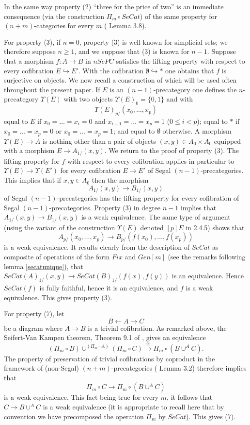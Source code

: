 In the same way property (2) ``three for the price of two''
is an immediate consequence (via the construction $\Pi _m\circ SeCat$)
of the same property for $(n+m)$-categories for every $m$
(\cite{nCAT} Lemma 3.8).

For property (3),
if $n=0$, property (3) is well known for
simplicial sets; we therefore suppose $n\geq 1$, and we suppose that (3)
is known for $n-1$.  Suppose that a morphism $f:A\rightarrow B$
in $nSePC$ satisfies the lifting property with respect to every
cofibration $E\hookrightarrow E'$. With the cofibration $\emptyset
\hookrightarrow \ast$ one
obtains that $f$ is surjective on objects. We now recall a
construction of \cite{limits} which will be used often throughout the
present paper. If $E$ is an $(n-1)$-precategory one defines the $n$-precategory
$\Upsilon (E)$ with two objects $\Upsilon (E)_0 = \{ 0,1\}$ and with
$$
\Upsilon (E)_{p/}(x_0,\ldots , x_p)
$$
equal to $E$
if $x_0=\ldots = x_i=0$ and $x_{i+1}=\ldots = x_p = 1$ ($0\leq i<p$); equal
to $\ast$
if $x_0=\ldots = x_p=0$ or $x_0=\ldots = x_p=1$; and equal
to $\emptyset$
otherwise. A morphism $\Upsilon (E)\rightarrow A$
 is nothing other than
a pair of objects $(x,y)\in A_0\times A_0$ equipped with a morphism
$E\rightarrow
A_{1/}(x,y)$. We return to the proof of property (3). The
lifting property for $f$ with respect to every cofibration
applies in particular
to $\Upsilon (E)\rightarrow \Upsilon (E')$ for
every cofibration $E\rightarrow E'$ of Segal $(n-1)$-precategories. This
implies
that if $x,y\in A_0$ then the morphism
$$
A_{1/}(x,y)\rightarrow B_{1/}(x,y)
$$
of Segal $(n-1)$-precategories has the lifting property for every
cofibration of Segal $(n-1)$-precategories. Property (3) in degree $n-1$
implies that $A_{1/} (x,y)\rightarrow B_{1/}(x,y)$ is a weak
equivalence. The same type of argument (using the variant of
the construction $\Upsilon (E)$ denoted $[p]E$
in \cite{limits} 2.4.5) shows that
$$
A_{p/}(x_0,\ldots , x_p)\rightarrow B_{p/}(f(x_0),\ldots , f(x_p))
$$
is a
weak equivalence. It results clearly from the description of $SeCat$ as
composite of operations of the form $Fix$ and $Gen[m]$ (see the remarks
following lemma \ref{secatunique}), that $SeCat(A)_{1/}(x,y)\rightarrow
SeCat(B)_{1/}(f(x), f(y))$ is an equivalence. Hence $SeCat(f)$ is fully
faithful, hence it is an equivalence, and $f$ is a weak equivalence.
This gives property (3).

For property (7), let
$$
B\leftarrow     A\rightarrow C
$$
be a diagram where $A\rightarrow B$ is a trivial cofibration. As remarked
above,  the Seifert-Van Kampen theorem, Theorem 9.1 of
\cite{nCAT}, gives an equivalence
$$
(\Pi _m\circ B) \cup ^{(\Pi _m \circ A)}(\Pi _m \circ C)
\stackrel{\cong}{\rightarrow} \Pi _m\circ (B\cup ^AC).
$$
The property of preservation of trivial cofibrations by coproduct
in the framework
of (non-Segal) $(n+m)$-precategories (\cite{nCAT} Lemma 3.2) therefore implies
that
$$
\Pi _m \circ C\rightarrow
\Pi _m \circ (B\cup ^AC)
$$
is a weak equivalence. This fact being true for every $m$, it follows
that $C\rightarrow
B\cup ^AC$ is a weak equivalence (it is appropriate to recall here that by
convention we have precomposed the operation $\Pi_m$ by $SeCat$). This
gives (7).
\eop


